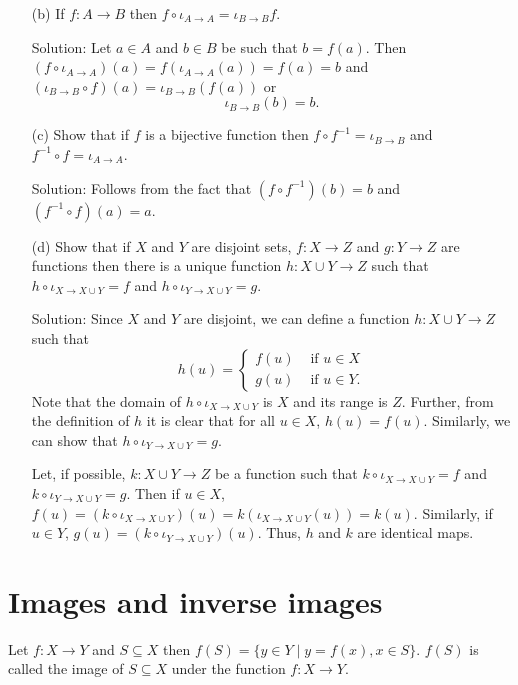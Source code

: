 \begin{enumerate}
\begin{enumerate}
\item[(b)] If $f: A \rightarrow B$ then $f \circ \iota_{A \rightarrow A} = 
\iota_{B \rightarrow B}f$.
\item[Solution:] Let $a \in A$ and $b \in B$ be such that $b = f(a)$.
Then $(f \circ \iota_{A \rightarrow A})(a) = f(\iota_{A \rightarrow A}(a))
= f(a) = b$ and $(\iota_{B \rightarrow B} \circ f)(a) = 
\iota_{B \rightarrow B}(f(a))$ or 
\[
\iota_{B \rightarrow B}(b) = b.
\]

\item[(c)] Show that if $f$ is a bijective function then $f \circ f^{-1}
= \iota_{B \rightarrow B}$ and $f^{-1} \circ f = \iota_{A \rightarrow A}$.
\item[Solution:] Follows from the fact that $(f \circ f^{-1})(b) = b$ and
$(f^{-1} \circ f)(a) = a$.

\item[(d)] Show that if $X$ and $Y$ are disjoint sets, $f: X \rightarrow Z$
and $g: Y \rightarrow Z$ are functions then there is a unique function
$h: X \cup Y \rightarrow Z$ such that $h \circ \iota_{X \rightarrow X \cup
Y} = f$ and $h \circ \iota_{Y \rightarrow X \cup Y} = g$.
\item[Solution:] Since $X$ and $Y$ are disjoint, we can define a function
$h: X \cup Y \rightarrow Z$ such that
\[
h(u) = 
\begin{cases} f(u) & \text{ if } u \in X \\
g(u) & \text{ if } u \in Y.
\end{cases}
\]
Note that the domain of $h \circ \iota_{X \rightarrow X \cup Y}$ is $X$
and its range is $Z$. Further, from the definition of $h$ it is clear that
for all $u \in X$, $h(u) = f(u)$. Similarly, we can show that $h \circ
\iota_{Y \rightarrow X \cup Y} = g$.

Let, if possible, $k: X \cup Y \rightarrow Z$ be a function such that $k
\circ \iota_{X \rightarrow X \cup Y} = f$ and $k \circ
\iota_{Y \rightarrow X \cup Y} = g$. Then if $u \in X$, $f(u) = (k \circ 
\iota_{X \rightarrow X \cup Y})(u) = k(\iota_{X \rightarrow X \cup Y}(u))
= k(u)$. Similarly, if $u \in Y$, $g(u) = (k \circ 
\iota_{Y \rightarrow X \cup Y})(u)$. Thus, $h$ and $k$ are identical maps.
\end{enumerate}
\end{enumerate}

\section{Images and inverse images}\label{c2s4}
\begin{defn}\label{c2s4d1}
Let $f: X \rightarrow Y$ and $S \subseteq X$ then $f(S) = \{y \in Y\;|\;
y = f(x), x \in S\}$. $f(S)$ is called the image of $S \subseteq X$ under
the function $f: X \rightarrow Y$.
\end{defn}


